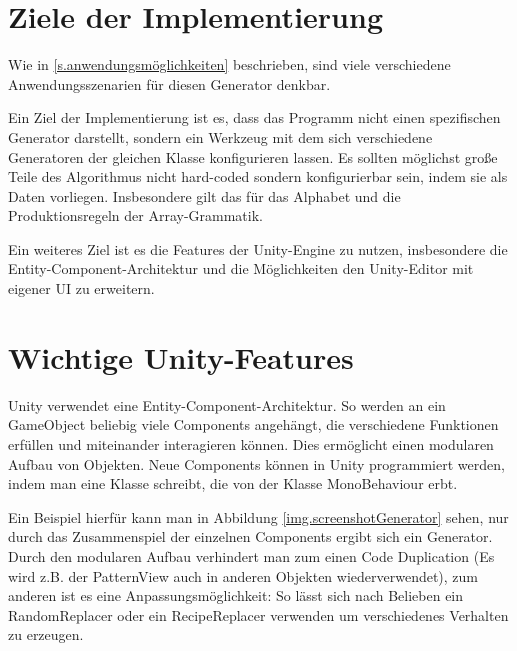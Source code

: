 

\section{Ziele der Implementierung}

Wie in \ref{s.anwendungsmöglichkeiten} beschrieben, sind viele verschiedene Anwendungsszenarien für diesen Generator denkbar. 

Ein Ziel der Implementierung ist es, dass das Programm nicht einen spezifischen Generator darstellt, sondern ein Werkzeug mit dem sich verschiedene Generatoren der gleichen Klasse konfigurieren lassen. Es sollten möglichst große Teile des Algorithmus nicht hard-coded sondern konfigurierbar sein, indem sie als Daten vorliegen. Insbesondere gilt das für das Alphabet und die Produktionsregeln der Array-Grammatik.

Ein weiteres Ziel ist es die Features der Unity-Engine zu nutzen, insbesondere die Entity-Component-Architektur und die Möglichkeiten den Unity-Editor mit eigener UI zu erweitern. 

\section{Wichtige Unity-Features}

Unity verwendet eine Entity-Component-Architektur. So werden an ein GameObject beliebig viele Components angehängt, die verschiedene Funktionen erfüllen und miteinander interagieren können. Dies ermöglicht einen modularen Aufbau von Objekten. 
\cite[Seite: GameObjects]{unityManual}
Neue Components können in Unity programmiert werden, indem man eine Klasse schreibt, die von der Klasse MonoBehaviour erbt.
\cite[Seite: CreatingAndUsingScripts]{unityManual}

Ein Beispiel hierfür kann man in Abbildung \ref{img.screenshotGenerator} sehen, nur durch das Zusammenspiel der einzelnen Components ergibt sich ein Generator. Durch den modularen Aufbau verhindert man zum einen Code Duplication (Es wird z.B. der PatternView auch in anderen Objekten wiederverwendet), zum anderen ist es eine Anpassungsmöglichkeit: So lässt sich nach Belieben ein RandomReplacer oder ein RecipeReplacer verwenden um verschiedenes Verhalten zu erzeugen. 


